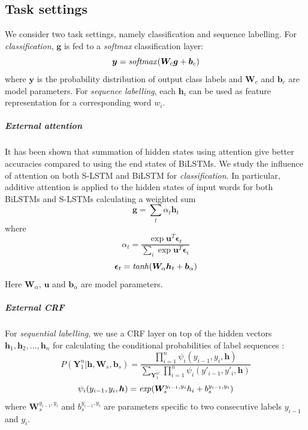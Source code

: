 \documentclass[11pt,a4paper]{article}
\begin{document}
\subsection{Task settings}
\label{sec:ext_attn}

We consider two task settings, namely classification and sequence labelling. 
For \emph{classification}, $\boldsymbol{g}$ is fed to a {\it softmax} classification layer:
\[
\boldsymbol{y} = {\it softmax}(\boldsymbol{W}_c \boldsymbol{g} + \boldsymbol{b}_c)
\]
where $\boldsymbol{y}$ is the probability distribution of output class labels and $\boldsymbol{W}_c$ and $\boldsymbol{b}_c$ are model parameters. 
For \emph{sequence labelling}, each $\boldsymbol{h}_i$ can be used as feature representation for a corresponding word $w_i$.

\subparagraph{External attention}
It has been shown that summation of hidden states using attention \cite{bahdanau2014neural,yang2016hierarchical} give better accuracies compared to using the end states of BiLSTMs. 
We study the influence of attention on both S-LSTM and BiLSTM for \emph{classification}. 
In particular, additive attention \cite{bahdanau2014neural} is applied to the hidden states of input words for both BiLSTMs and S-LSTMs calculating a weighted sum
\begin{equation*}
\boldsymbol{g} = \sum_t \alpha_t \boldsymbol{h}_t
\end{equation*}
where
\begin{equation*}
\alpha_t = \frac{\exp{\boldsymbol{u}^T \boldsymbol{\epsilon}_t}}{\sum_i \exp{\boldsymbol{u}^T\boldsymbol{\epsilon}_i}}
\end{equation*}
\begin{equation*}
\boldsymbol{\epsilon}_t= {\it tanh}(\boldsymbol{W}_\alpha \boldsymbol{h}_t+\boldsymbol{b}_\alpha)
\end{equation*}
Here $\boldsymbol{W}_\alpha$, $\boldsymbol{u}$ and $\boldsymbol{b}_\alpha$ are model parameters.


\subparagraph{External CRF}
For \emph{sequential labelling}, we use a CRF layer on top of the hidden vectors $\boldsymbol{h}_1, \boldsymbol{h}_2, \dots, \boldsymbol{h}_n$ for calculating the conditional probabilities of label sequences \cite{huang2015bidirectional,ma2016end}:
\[
P(\boldsymbol{Y}_1^n|\boldsymbol{h}, \boldsymbol{W}_s, \boldsymbol{b}_s) = \frac{\prod_{i=1}^n \psi_i(y_{i-1}, y_i, \boldsymbol{h})}{\sum_{\boldsymbol{Y}_1^{n'}} \prod_{i=1}^n \psi_i(y'_{i-1}, y'_i, \boldsymbol{h})}
\] 
\[
\psi_i(y_{i-1}, y_i, \boldsymbol{h})= {\it exp}(\boldsymbol{W}_{s}^{y_{i-1},y_i} h_i + b_{s}^{y_{i-1},y_i})
\]
where $\boldsymbol{W}_{s}^{y_{i-1},y_i}$ and $b_{s}^{y_{i-1},y_i}$ are parameters specific to two consecutive labels $y_{i-1}$ and $y_i$. 
\end{document}
